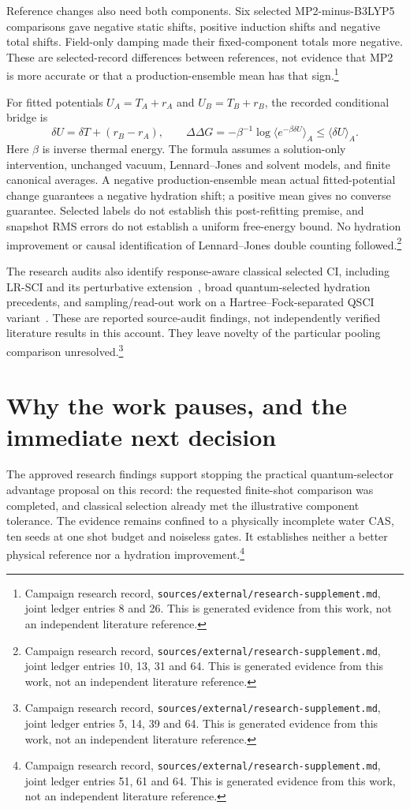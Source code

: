 \documentclass{article}
\newcommand{\record}[1]{\footnote{Campaign research record, \texttt{sources/external/research-supplement.md}, #1. This is generated evidence from this work, not an independent literature reference.}}
\begin{document}
Reference changes also need both components. Six selected MP2-minus-B3LYP5 comparisons gave negative static shifts, positive induction shifts and negative total shifts. Field-only damping made their fixed-component totals more negative. These are selected-record differences between references, not evidence that MP2 is more accurate or that a production-ensemble mean has that sign.\record{joint ledger entries 8 and 26}

For fitted potentials \(U_A=T_A+r_A\) and \(U_B=T_B+r_B\), the recorded conditional bridge is
\[
 \delta U=\delta T+(r_B-r_A),\qquad
 \Delta\Delta G=-\beta^{-1}\log\langle e^{-\beta\delta U}\rangle_A
 \leq\langle\delta U\rangle_A.
\]
Here \(\beta\) is inverse thermal energy. The formula assumes a solution-only intervention, unchanged vacuum, Lennard--Jones and solvent models, and finite canonical averages. A negative production-ensemble mean actual fitted-potential change guarantees a negative hydration shift; a positive mean gives no converse guarantee. Selected labels do not establish this post-refitting premise, and snapshot RMS errors do not establish a uniform free-energy bound. No hydration improvement or causal identification of Lennard--Jones double counting followed.\record{joint ledger entries 10, 13, 31 and 64}

The research audits also identify response-aware classical selected CI, including LR-SCI and its perturbative extension~\cite{LR,LRPT}, broad quantum-selected hydration precedents, and sampling/read-out work on a Hartree--Fock-separated QSCI variant~\cite{readout}. These are reported source-audit findings, not independently verified literature results in this account. They leave novelty of the particular pooling comparison unresolved.\record{joint ledger entries 5, 14, 39 and 64}

\section{Why the work pauses, and the immediate next decision}
The approved research findings support stopping the practical quantum-selector advantage proposal on this record: the requested finite-shot comparison was completed, and classical selection already met the illustrative component tolerance. The evidence remains confined to a physically incomplete water CAS, ten seeds at one shot budget and noiseless gates. It establishes neither a better physical reference nor a hydration improvement.\record{joint ledger entries 51, 61 and 64}
\end{document}
